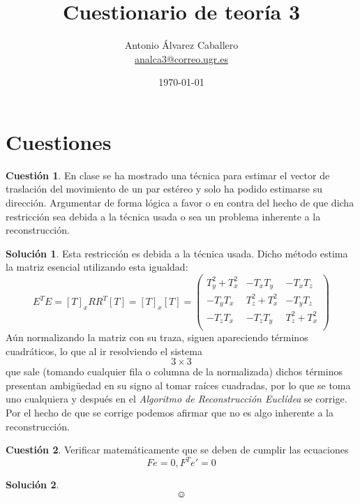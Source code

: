 \documentclass[a4paper, 11pt]{article}
\title{Cuestionario de teoría 3}
\author{Antonio Álvarez Caballero\\
    \href{mailto:analca3@correo.ugr.es}{analca3@correo.ugr.es}}
\date{\today}
\theoremstyle{definition}
\newtheorem{cuestion}{Cuestión}
\newtheorem*{solucion}{Solución}
\begin{document}
  \maketitle

  \section{Cuestiones}

  \begin{cuestion}
    En clase se ha mostrado una técnica para estimar el vector de traslación del movimiento de
    un par estéreo y solo ha podido estimarse su dirección. Argumentar de forma lógica a favor o
    en contra del hecho de que dicha restricción sea debida a la técnica usada o sea un problema
    inherente a la reconstrucción.
  \end{cuestion}

  \begin{solucion}
    Esta restricción es debida a la técnica usada. Dicho método estima la matriz
    esencial utilizando esta igualdad:
    \[ E^T E = [T]_x R R^T [T] = [T]_x [T] = \left(
    \begin{array}{ccc}
        T_y^2 + T_x^2 & -T_xT_y & -T_xT_z \\
        -T_yT_x & T_z^2 + T_x^2 & -T_yT_z \\
        -T_zT_x & -T_zT_y & T_z^2 + T_x^2 \\
    \end{array}
    \right) \]
    Aún normalizando la matriz con su traza, siguen apareciendo términos cuadráticos,
    lo que al ir resolviendo el sistema $$3\times3$$ que sale (tomando cualquier fila o columna de la normalizada)
    dichos términos presentan ambigüedad en su signo al tomar raíces cuadradas, por
    lo que se toma uno cualquiera y después en el \textit{Algoritmo de Reconstrucción Euclídea}
    se corrige. Por el hecho de que se corrige podemos afirmar que no es algo inherente a la reconstrucción.
  \end{solucion}

  \begin{cuestion}
    Verificar matemáticamente que se deben de cumplir las ecuaciones $$ Fe = 0, F^Te'= 0$$

  \end{cuestion}

  \begin{solucion}

      $$\smiley$$


  \end{solucion}
\end{document}
